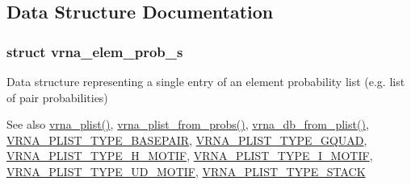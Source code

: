 \subsection{Data Structure Documentation}
\label{structvrna__elem__prob__s}
\subsubsection{struct vrna\+\_\+elem\+\_\+prob\+\_\+s}
Data structure representing a single entry of an element probability list (e.\+g. list of pair probabilities) 

\begin{DoxySeeAlso}{See also}
\mbox{\hyperlink{group__struct__utils__plist_gaf002d69024d709744664a8b9ca3dd77d}{vrna\+\_\+plist()}}, \mbox{\hyperlink{group__part__func__global_ga94f6efc0b8d8712b023452794a0a5bd2}{vrna\+\_\+plist\+\_\+from\+\_\+probs()}}, \mbox{\hyperlink{group__struct__utils__dot__bracket_ga6a51a36b9245d0bac868c5cd172b9611}{vrna\+\_\+db\+\_\+from\+\_\+plist()}}, \mbox{\hyperlink{group__struct__utils__plist_ga7c7484a8a1e6704b1aefaf589f3b27c1}{V\+R\+N\+A\+\_\+\+P\+L\+I\+S\+T\+\_\+\+T\+Y\+P\+E\+\_\+\+B\+A\+S\+E\+P\+A\+IR}}, \mbox{\hyperlink{group__struct__utils__plist_gac91ab79e9feede5347103949ecf04f8a}{V\+R\+N\+A\+\_\+\+P\+L\+I\+S\+T\+\_\+\+T\+Y\+P\+E\+\_\+\+G\+Q\+U\+AD}}, \mbox{\hyperlink{group__struct__utils__plist_ga4d142e0187b8410b61ec2b168ed4513e}{V\+R\+N\+A\+\_\+\+P\+L\+I\+S\+T\+\_\+\+T\+Y\+P\+E\+\_\+\+H\+\_\+\+M\+O\+T\+IF}}, \mbox{\hyperlink{group__struct__utils__plist_gadf5905518079b5495bce3394cd7afb9a}{V\+R\+N\+A\+\_\+\+P\+L\+I\+S\+T\+\_\+\+T\+Y\+P\+E\+\_\+\+I\+\_\+\+M\+O\+T\+IF}}, \mbox{\hyperlink{group__struct__utils__plist_ga01d749cdb675dcdbac1dc5103378c699}{V\+R\+N\+A\+\_\+\+P\+L\+I\+S\+T\+\_\+\+T\+Y\+P\+E\+\_\+\+U\+D\+\_\+\+M\+O\+T\+IF}}, \mbox{\hyperlink{group__struct__utils__plist_ga36df728a95452170ca8684fc224299ea}{V\+R\+N\+A\+\_\+\+P\+L\+I\+S\+T\+\_\+\+T\+Y\+P\+E\+\_\+\+S\+T\+A\+CK}} 
\end{DoxySeeAlso}

